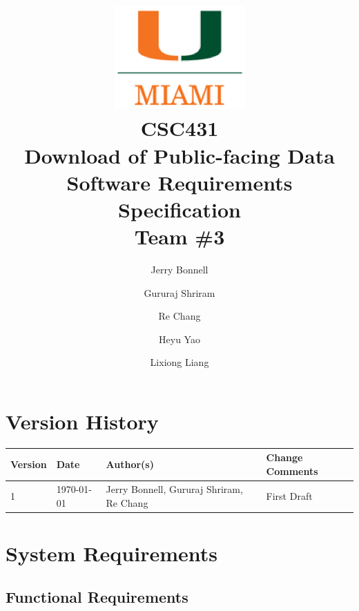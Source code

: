 \documentclass{article}
\begin{document}
\title{
	\includegraphics{images/um_logo.png} \\
	\vspace{0.1in}
	CSC431 \\
	\vspace{0.2in}
	\textbf{Download of Public-facing Data} \\
	\large Software Requirements Specification \\
	Team \#3
}

\author{
	Jerry Bonnell
	\and Gururaj Shriram
	\and Re Chang
	\and Heyu Yao
	\and Lixiong Liang
}

\date{}
\maketitle

\clearpage
\section*{Version History}

\begin{tabularx}{\textwidth}{| l | l | X | l |}
	\hline
	\textbf{Version} & \textbf{Date} & \textbf{Author(s)} & \textbf{Change Comments} \\
	\hline
	1 & \today & Jerry Bonnell, Gururaj Shriram, Re Chang & First Draft \\
	\hline
\end{tabularx}

\clearpage
\tableofcontents

\clearpage
\listoffigures
\listoftables

\clearpage

\section{System Requirements}

\subsection{Functional Requirements}
\end{document}
